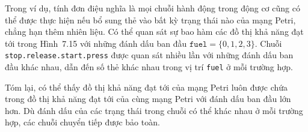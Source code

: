 Trong ví dụ, tính đơn điệu nghĩa là mọi chuỗi hành động trong động cơ cũng có thể được thực hiện nếu bổ sung thẻ vào bất kỳ trạng thái nào của mạng Petri, chẳng hạn thêm nhiên liệu. Có thể quan sát sự bao hàm các đồ thị khả năng đạt tới trong Hình~7.15 với những đánh dấu ban đầu $\texttt{fuel}=\{0,1,2,3\}$. Chuỗi \texttt{stop.release.start.press} được quan sát nhiều lần với những đánh dấu ban đầu khác nhau, dẫn đến số thẻ khác nhau trong vị trí \texttt{fuel} ở mỗi trường hợp.


Tóm lại, có thể thấy đồ thị khả năng đạt tới của mạng Petri luôn được chứa trong đồ thị khả năng đạt tới của cùng mạng Petri với đánh dấu ban đầu lớn hơn. Dù đánh dấu của các trạng thái trong chuỗi có thể khác nhau ở mỗi trường hợp, các chuỗi chuyển tiếp được bảo toàn.

